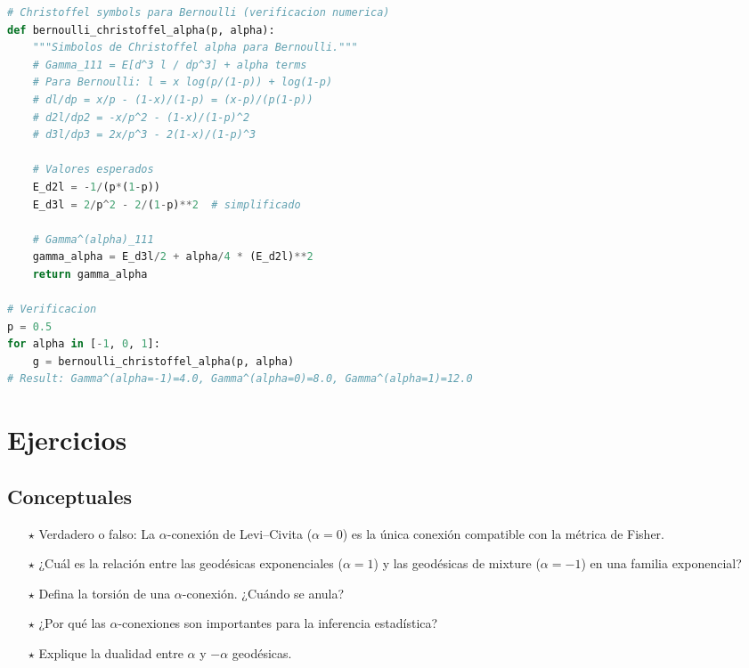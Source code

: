 \begin{lstlisting}[language=Python, style=PythonStyle]
# Christoffel symbols para Bernoulli (verificacion numerica)
def bernoulli_christoffel_alpha(p, alpha):
    """Simbolos de Christoffel alpha para Bernoulli."""
    # Gamma_111 = E[d^3 l / dp^3] + alpha terms
    # Para Bernoulli: l = x log(p/(1-p)) + log(1-p)
    # dl/dp = x/p - (1-x)/(1-p) = (x-p)/(p(1-p))
    # d2l/dp2 = -x/p^2 - (1-x)/(1-p)^2
    # d3l/dp3 = 2x/p^3 - 2(1-x)/(1-p)^3
    
    # Valores esperados
    E_d2l = -1/(p*(1-p))
    E_d3l = 2/p^2 - 2/(1-p)**2  # simplificado
    
    # Gamma^(alpha)_111
    gamma_alpha = E_d3l/2 + alpha/4 * (E_d2l)**2
    return gamma_alpha

# Verificacion
p = 0.5
for alpha in [-1, 0, 1]:
    g = bernoulli_christoffel_alpha(p, alpha)
# Result: Gamma^(alpha=-1)=4.0, Gamma^(alpha=0)=8.0, Gamma^(alpha=1)=12.0
\end{lstlisting}

\section{Ejercicios}

\subsection*{Conceptuales}
\begin{enumerate}
	\item[$\star$] Verdadero o falso: La $\alpha$-conexión de Levi--Civita ($\alpha = 0$) es la única conexión compatible con la métrica de Fisher.
	\item[$\star$] ¿Cuál es la relación entre las geodésicas exponenciales ($\alpha = 1$) y las geodésicas de mixture ($\alpha = -1$) en una familia exponencial?
	\item[$\star$] Defina la torsión de una $\alpha$-conexión.  ¿Cuándo se anula?
	\item[$\star$] ¿Por qué las $\alpha$-conexiones son importantes para la inferencia estadística?
	\item[$\star$] Explique la dualidad entre $\alpha$ y $-\alpha$ geodésicas.
\end{enumerate}

